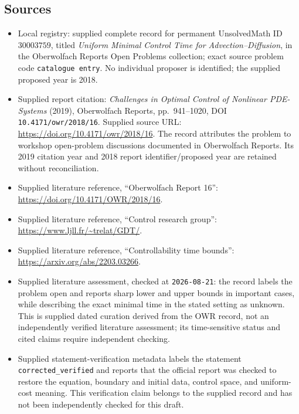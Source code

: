 \documentclass[11pt]{article}
\begin{document}
\subsection{Sources}
\begin{itemize}
\item Local registry: supplied complete record for permanent UnsolvedMath ID \(30003759\), titled \emph{Uniform Minimal Control Time for Advection--Diffusion}, in the Oberwolfach Reports Open Problems collection; exact source problem code \texttt{catalogue entry}. No individual proposer is identified; the supplied proposed year is 2018.
\item Supplied report citation: \emph{Challenges in Optimal Control of Nonlinear PDE-Systems} (2019), Oberwolfach Reports, pp.\ 941--1020, DOI \texttt{10.4171/owr/2018/16}. Supplied source URL: \url{https://doi.org/10.4171/owr/2018/16}. The record attributes the problem to workshop open-problem discussions documented in Oberwolfach Reports. Its 2019 citation year and 2018 report identifier/proposed year are retained without reconciliation.
\item Supplied literature reference, ``Oberwolfach Report 16'': \url{https://doi.org/10.4171/OWR/2018/16}.
\item Supplied literature reference, ``Control research group'': \url{https://www.ljll.fr/~trelat/GDT/}.
\item Supplied literature reference, ``Controllability time bounds'': \url{https://arxiv.org/abs/2203.03266}.
\item Supplied literature assessment, checked at \texttt{2026-08-21}: the record labels the problem open and reports sharp lower and upper bounds in important cases, while describing the exact minimal time in the stated setting as unknown. This is supplied dated curation derived from the OWR record, not an independently verified literature assessment; its time-sensitive status and cited claims require independent checking.
\item Supplied statement-verification metadata labels the statement \texttt{corrected\_verified} and reports that the official report was checked to restore the equation, boundary and initial data, control space, and uniform-cost meaning. This verification claim belongs to the supplied record and has not been independently checked for this draft.
\end{itemize}
\end{document}
